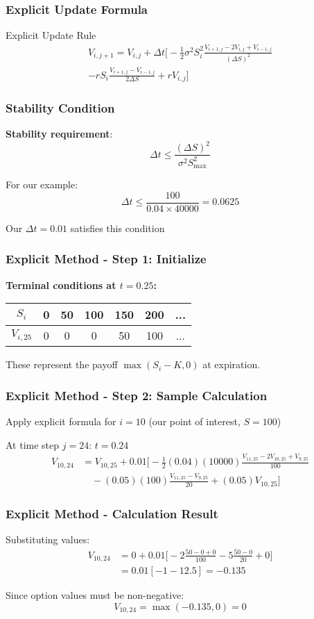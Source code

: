 \documentclass[aspectratio=169]{beamer}
\begin{document}
\begin{frame}
\frametitle{Explicit Update Formula}
\begin{block}{Explicit Update Rule}
\begin{multline}
V_{i,j+1} = V_{i,j} + \Delta t \bigg[ -\frac{1}{2}\sigma^2 S_i^2 \frac{V_{i+1,j} - 2V_{i,j} + V_{i-1,j}}{(\Delta S)^2} \\
- rS_i \frac{V_{i+1,j} - V_{i-1,j}}{2\Delta S} + rV_{i,j} \bigg]
\end{multline}
\end{block}
\end{frame}

\begin{frame}
\frametitle{Stability Condition}
\textbf{Stability requirement}: 
\[\Delta t \leq \frac{(\Delta S)^2}{\sigma^2 S_{\max}^2}\]

For our example:
\[\Delta t \leq \frac{100}{0.04 \times 40000} = 0.0625\]

Our $\Delta t = 0.01$ satisfies this condition \checkmark
\end{frame}

\begin{frame}
\frametitle{Explicit Method - Step 1: Initialize}
\textbf{Terminal conditions at $t = 0.25$:}

\begin{center}
\begin{tabular}{c|c|c|c|c|c|c}
$S_i$ & 0 & 50 & 100 & 150 & 200 & ... \\
\hline
$V_{i,25}$ & 0 & 0 & 0 & 50 & 100 & ...
\end{tabular}
\end{center}

These represent the payoff $\max(S_i - K, 0)$ at expiration.
\end{frame}

\begin{frame}
\frametitle{Explicit Method - Step 2: Sample Calculation}
Apply explicit formula for $i = 10$ (our point of interest, $S = 100$)

At time step $j = 24$: $t = 0.24$
\begin{align}
V_{10,24} &= V_{10,25} + 0.01 \bigg[ -\frac{1}{2}(0.04)(10000) \frac{V_{11,25} - 2V_{10,25} + V_{9,25}}{100} \\
&\quad - (0.05)(100) \frac{V_{11,25} - V_{9,25}}{20} + (0.05)V_{10,25} \bigg]
\end{align}
\end{frame}

\begin{frame}
\frametitle{Explicit Method - Calculation Result}
Substituting values:
\begin{align}
V_{10,24} &= 0 + 0.01 \bigg[ -2 \frac{50 - 0 + 0}{100} - 5 \frac{50 - 0}{20} + 0 \bigg] \\
&= 0.01[-1 - 12.5] = -0.135
\end{align}

Since option values must be non-negative: 
\[V_{10,24} = \max(-0.135, 0) = 0\]
\end{frame}
\end{document}
